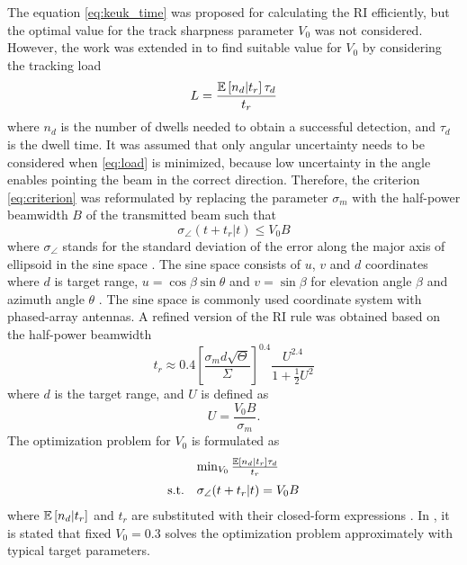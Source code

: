 \documentclass[english, 12pt, a4paper, elec, utf8, a-1b, online]{aaltothesis}
\newcommand{\E}[1]{\mathbb{E}\left[ #1 \right]}
\newcommand{\ri}{t_r}
\begin{document}
The equation \eqref{eq:keuk_time} was proposed for calculating the RI efficiently, but the optimal value for the track sharpness parameter $V_0$ was not considered.
However, the work was extended in \cite{vanKeuk1993} to find suitable value for $V_0$ by considering the tracking load
\begin{equation}\label{eq:load}
    L = \frac{\E{\ndwells | \ri} \tau_d}{\ri}
\end{equation}
where $n_d$ is the number of dwells needed to obtain a successful detection, and $\tau_d$ is the dwell time.
It was assumed that only angular uncertainty needs to be considered when \eqref{eq:load} is minimized, 
because low uncertainty in the angle enables pointing the beam in the correct direction.
Therefore, the criterion \eqref{eq:criterion} was reformulated by replacing the parameter $\sigma_m$ with the half-power beamwidth $B$ of the transmitted beam such that
\begin{equation} \label{eq:criterion2}
    \sigma_\angle(t + \ri | t) \leq V_0 B
\end{equation}
where $\sigma_\angle$ stands for the standard deviation of the error along the major axis of ellipsoid in the sine space \cite{vanKeuk1993}.
The sine space consists of $u$, $v$ and $d$ coordinates where $d$ is target range, $u=\cos \beta \sin \theta$ and $v=\sin \beta$ for elevation angle $\beta$ and azimuth angle $\theta$ \cite{Mailloux2017}.
The sine space is commonly used coordinate system with phased-array antennas.
A refined version of the RI rule was obtained based on the half-power beamwidth
\begin{equation}\label{eq:van_keuk_revisited}
    \ri \approx 0.4 \left[ \frac{\sigma_m d \sqrt{\Theta}}{\Sigma} \right]^{0.4} \frac{U^{2.4}}{1+\frac{1}{2}U^2}
\end{equation}
where $d$ is the target range, and $U$ is defined as
\begin{equation}
    U = \frac{V_0 B}{\sigma_m}.
\end{equation}
The optimization problem for $V_0$ is formulated as 
\begin{equation}
\begin{array}{ll}
     & \min_{V_0} \frac{\E{\ndwells | \ri} \tau_d}{\ri} \\ [7pt]
    \text{s.t.} & \sigma_\angle(t + \ri | t) = V_0 B
\end{array}
\end{equation}
where $\E{\ndwells | \ri}$ and $\ri$ are substituted with their closed-form expressions \cite{vanKeuk1993}.
In \cite{vanKeuk1993}, it is stated that fixed $V_0=0.3$ solves the optimization problem approximately with typical target parameters.
\end{document}
